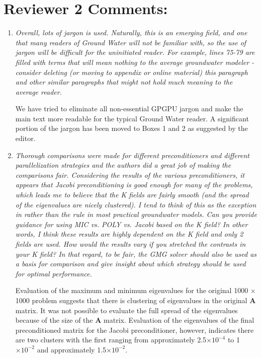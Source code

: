\documentclass[12pt]{article} %
\begin{document}
\section*{Reviewer 2 Comments:}
\begin{enumerate}
\item \textit{Overall, lots of jargon is used. Naturally, this is an emerging field, and one that many readers of Ground Water will not be familiar with, so the use of jargon will be difficult for the uninitiated reader. For example, lines 75-79 are filled with terms that will mean nothing to the average groundwater modeler - consider deleting (or moving to appendix or online material) this paragraph and other similar paragraphs that might not hold much meaning to the average reader.} 

We have tried to eliminate all non-essential GPGPU jargon and make the main text more readable for the typical Ground Water reader.  A significant portion of the jargon has been moved to Boxes 1 and 2 as suggested by the editor.

\item \label{kpropertydiscussion} \textit{Thorough comparisons were made for different preconditioners and different parallelization strategies and the authors did a great job of making the comparisons fair. Considering the results of the various preconditioners, it appears that Jacobi preconditioning is good enough for many of the problems, which leads me to believe that the K fields are fairly smooth (and the spread of the eigenvalues are nicely clustered). I tend to think of this as the exception in rather than the rule in most practical groundwater models. Can you provide guidance for using MIC vs. POLY vs. Jacobi based on the K field? In other words, I think these results are highly dependent on the K field and only 2 fields are used. How would the results vary if you stretched the contrasts in your K field? In that regard, to be fair, the GMG solver should also be used as a basis for comparison and give insight about which strategy should be used for optimal performance.} 

Evaluation of the maximum and minimum eigenvalues for the original 1000 $\times$ 1000 problem suggests that there is clustering of eigenvalues in the original $\mathbf{A}$ matrix. It was not possible to evaluate the full spread of the eigenvalues because of the size of the $\mathbf{A}$ matrix. Evaluation of the eigenvalues of the final preconditioned matrix for the Jacobi preconditioner, however, indicates there are two clusters with the first ranging from approximately 2.5$\times 10^{-4}$ to 1$\times 10^{-2}$ and approximately 1.5$\times 10^{-2}$.


\end{enumerate}
\end{document}
